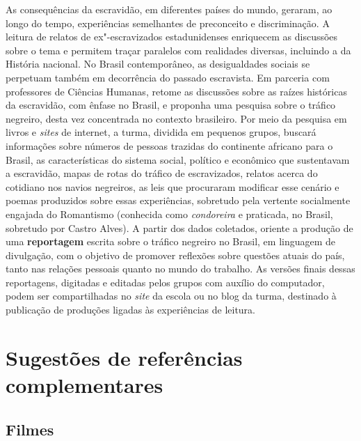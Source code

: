 \documentclass[12pt]{extarticle}
\begin{document}
As consequências da escravidão, em diferentes países do mundo,
geraram, ao longo do tempo, experiências semelhantes de preconceito e
discriminação. A leitura de relatos de ex"-escravizados estadunidenses
enriquecem as discussões sobre o tema e permitem traçar paralelos com
realidades diversas, incluindo a da História nacional. No Brasil
contemporâneo, as desigualdades sociais se perpetuam também em
decorrência do passado escravista. Em parceria com professores de
Ciências Humanas, retome as discussões sobre as raízes históricas da
escravidão, com ênfase no Brasil, e proponha uma pesquisa sobre o
tráfico negreiro, desta vez concentrada no contexto brasileiro. Por
meio da pesquisa em livros e \emph{sites} de internet, a turma,
dividida em pequenos grupos, buscará informações sobre números de
pessoas trazidas do continente africano para o Brasil, as
características do sistema social, político e econômico que
sustentavam a escravidão, mapas de rotas do tráfico de escravizados,
relatos acerca do cotidiano nos navios negreiros, as leis que
procuraram modificar esse cenário e poemas produzidos sobre essas
experiências, sobretudo pela vertente socialmente engajada do
Romantismo (conhecida como \emph{condoreira} e praticada, no Brasil,
sobretudo por Castro Alves). A partir dos dados coletados, oriente a
produção de uma \textbf{reportagem} escrita sobre o tráfico negreiro
no Brasil, em linguagem de divulgação, com o objetivo de promover
reflexões sobre questões atuais do país, tanto nas relações pessoais
quanto no mundo do trabalho. As versões finais dessas reportagens,
digitadas e editadas pelos grupos com auxílio do computador, podem ser
compartilhadas no \emph{site} da escola ou no blog da turma, destinado
à publicação de produções ligadas às experiências de leitura.

\section{Sugestões de referências complementares}\label{sugestoes}

\subsection{Filmes}
\end{document}
